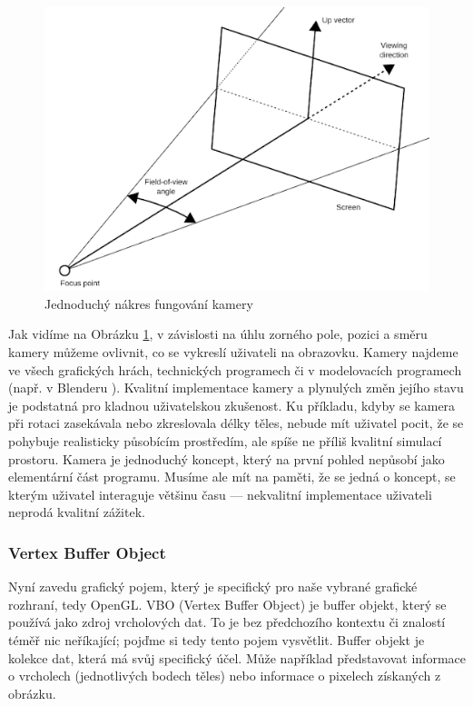 \documentclass[12pt]{article}
\begin{document}
\vspace{0.5cm}
\begin{figure}[h]
    \centering
    \includegraphics[width=14cm]{camera.png}
    \caption[Jednoduchý nákres fungování kamery]{Jednoduchý nákres fungování kamery \cite{camera_img}}
    \label{fig:Jednoduchý nákres fungování kamery}
\end{figure}

Jak vidíme na Obrázku \ref{fig:Jednoduchý nákres fungování kamery}, v závislosti na úhlu zorného pole, pozici a směru kamery můžeme ovlivnit, co se vykreslí uživateli na obrazovku. Kamery najdeme ve všech grafických hrách, technických programech či v modelovacích programech (např. v Blenderu \cite{blender}). Kvalitní implementace kamery a plynulých změn jejího stavu je podstatná pro kladnou uživatelskou zkušenost. Ku příkladu, kdyby se kamera při rotaci zasekávala nebo zkreslovala délky těles, nebude mít uživatel pocit, že se pohybuje realisticky působícím prostředím, ale spíše ne příliš kvalitní simulací prostoru. Kamera je jednoduchý koncept, který na první pohled nepůsobí jako elementární část programu. Musíme ale mít na paměti, že se jedná o koncept, se kterým uživatel interaguje většinu času — nekvalitní implementace uživateli neprodá kvalitní zážitek.

\subsubsection{Vertex Buffer Object}

Nyní zavedu grafický pojem, který je specifický pro naše vybrané grafické rozhraní, tedy OpenGL. VBO (Vertex Buffer Object) je buffer objekt, který se používá jako zdroj vrcholových dat. To je bez předchozího kontextu či znalostí téměř nic neříkající; pojďme si tedy tento pojem vysvětlit. Buffer objekt \cite{buffer_object} je kolekce dat, která má svůj specifický účel. Může například představovat informace o vrcholech (jednotlivých bodech těles) nebo informace o pixelech získaných z obrázku. \cite{vao_vbo_ebo}
\end{document}

